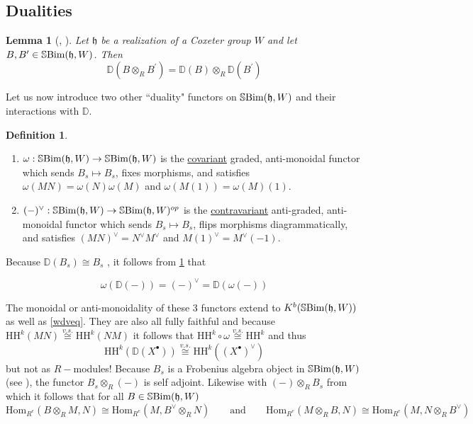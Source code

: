 \documentclass[10pt]{article}
\numberwithin{theorem}{section}
\newtheorem{lemma}[theorem]{Lemma}
\theoremstyle{definition}
\newtheorem{definition}[theorem]{Definition}
\renewcommand{\hom}{\mathrm{Hom}}
\newcommand{\hf}{\mathfrak{h}}
\newcommand{\Db}{\mathbb{D}}
\newcommand{\sbim}{\mathbb{S}\textnormal{Bim}}
\newcommand{\paren}[1]{\left( #1 \right)}
\newcommand{\un}[1]{\underline{#1}}
\newcommand{\hh}{\mathrm{HH}}
\newcommand{\xcong}[1]{\overset{#1}{\cong}}
\newcommand{\0}{\ \raisebox{-2ex}{\begin{tikzpicture}[xscale=0.25,yscale=0.3,thick,baseline]
 \draw (0,0) -- (0,3); 
\end{tikzpicture}}}
\renewcommand{\1}{\ \raisebox{-2ex}{\begin{tikzpicture}[xscale=0.25,yscale=0.3,thick,baseline]
 \draw (0,0) -- (0,1);
 \draw (0,2) -- (0,3);
 \node[dot] at (0,1) {};
  \node[dot] at (0,2) {};
\end{tikzpicture}}}
\begin{document}
\subsection{Dualities}

\begin{lemma}[{\cite[Exercise 18.13]{EMTW20}, \cite[Proposition 5.9]{Soe07}}]
\label{soelem}
    Let $\hf$ be a realization of a Coxeter group $W$ and let $B, B^\prime\in \sbim(\hf, W)$. Then 
    \[ \Db(B\otimes_R B^\prime) =\Db(B)\otimes_R \Db(B^\prime)  \]
\end{lemma}

Let us now introduce two other ``duality" functors on $\sbim(\hf, W)$ and their interactions with $\Db$.

\begin{definition}
\begin{enumerate}[(1)]
    \item $\omega : \sbim(\hf, W) \to \sbim(\hf, W)$
is the \un{covariant} graded, anti-monoidal functor which sends $B_s \mapsto B_s$, fixes morphisms, and satisfies $\omega(MN) = \omega(N)\omega(M)$ and $\omega(M(1)) = \omega(M)(1)$.
\item $(-)^\vee : \sbim(\hf, W) \to \sbim(\hf, W)^{op}$ is the \un{contravariant} anti-graded, anti-monoidal functor which sends $B_s \mapsto B_s$, flips morphisms diagrammatically, and satisfies 
$(MN)^\vee = N^\vee M^\vee $ and $M(1)^\vee = M^\vee(-1).$
\end{enumerate}
\end{definition}

Because $\Db(B_s)\cong B_s$ \cite[Exercise 18.12]{EMTW20}, it follows from \cref{soelem} that

\begin{equation}
\label{wdveq}
    \omega (\Db(-))=(-)^\vee =\Db(\omega(-))
\end{equation}

The monoidal or anti-monoidality of these 3 functors extend to $K^b(\sbim(\hf, W))$ as well as \cref{wdveq}. They are also all fully faithful and because $\hh^k(MN)\xcong{v.s.} \hh^k(NM)$ it follows that $\hh^k\circ \omega\xcong{v.s.}\hh^k$ and thus 
\[ \hh^k(\Db(X^\bullet))\xcong{v.s.} \hh^k\paren{ \paren{X^\bullet}^\vee} \]
but not as $R-$modules! Because $B_s$ is a Frobenius algebra object in $\sbim(\hf, W)$ (see \cite[Section 8.2]{EMTW20}), the functor $B_s\otimes_R(-)$ is self adjoint. Likewise with $(-)\otimes_R B_s$ from which it follows that for all $B\in \sbim(\hf, W)$
\[ \hom_{R^e}(B \otimes_R M, N)\cong \hom_{R^e}( M, B^\vee \otimes_R N) \qquad \text{and}\qquad \hom_{R^e}( M\otimes_R B, N)\cong \hom_{R^e}( M, N\otimes_R B^\vee ) \]
\end{document}
